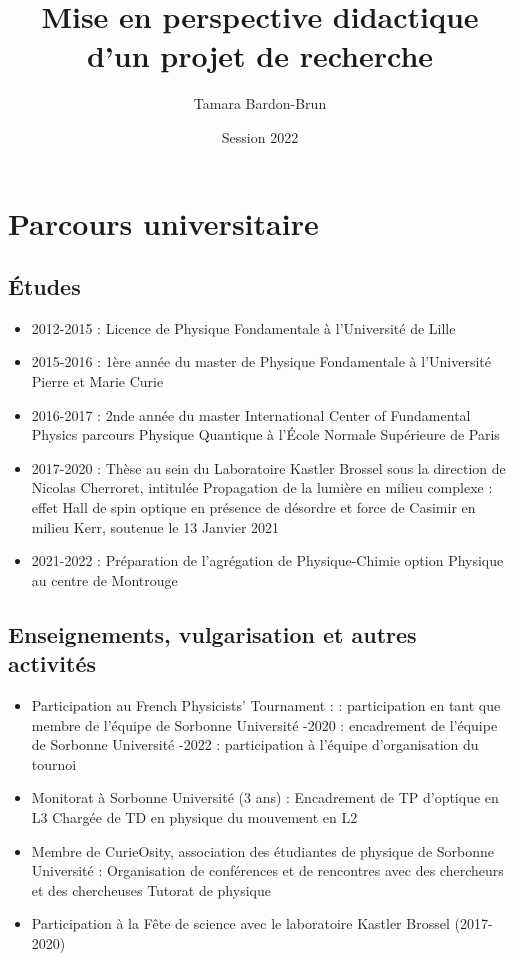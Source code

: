 \documentclass[a4paper,11pt]{article} %
\title{Mise en perspective didactique d'un projet de recherche}
\author{Tamara Bardon-Brun}
\date{Session 2022}
\newcommand{\pointmedian}{\fontfamily{cmr}\selectfont\textperiodcentered}
\begin{document}
	
	\maketitle
	
	\section{Parcours universitaire}
	\subsection{\'{E}tudes}
	\begin{itemize}
		\item 2012-2015 : Licence de Physique Fondamentale à l'Université de Lille
		\item 2015-2016 : 1ère année du master de Physique Fondamentale à l'Université Pierre et Marie Curie
		\item 2016-2017 : 2nde année du master International Center of Fundamental Physics parcours Physique Quantique à l'\'{E}cole Normale Supérieure de Paris
		\item 2017-2020 : Thèse au sein du Laboratoire Kastler Brossel sous la direction de Nicolas Cherroret, intitulée \og Propagation de la lumière en milieu complexe : effet Hall de spin optique en présence de désordre et force de Casimir en milieu Kerr\fg{}, soutenue le 13 Janvier 2021
		\item 2021-2022 : Préparation de l'agrégation de Physique-Chimie option Physique au centre de Montrouge
	\end{itemize}
	
	\subsection{Enseignements, vulgarisation et autres activités}
	\begin{itemize}
		\item Participation au French Physicists' Tournament :
		 : participation en tant que membre de l'équipe de Sorbonne Université
		-2020 : encadrement de l'équipe de Sorbonne Université
		-2022 : participation à l'équipe d'organisation du tournoi \\
		\item Monitorat à Sorbonne Université (3 ans) :
		\subitem Encadrement de TP d'optique en L3
		\subitem Chargée de TD en physique du mouvement en L2 \\
		\item Membre de CurieOsity, association des étudiant\pointmedian es de physique de Sorbonne Université :
		\subitem Organisation de conférences et de rencontres avec des chercheurs et des chercheuses
		\subitem Tutorat de physique\\
		\item Participation à la Fête de science avec le laboratoire Kastler Brossel (2017-2020)
	\end{itemize}
\end{document}
